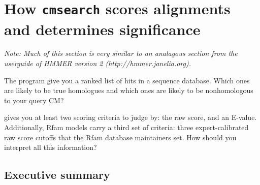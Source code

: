 \section{How \texttt{cmsearch} scores alignments and determines significance}

\emph{Note: Much of this section is very similar to an analagous
section from the userguide of HMMER version 2
(http://hmmer.janelia.org).}

The  program give you a ranked list of hits in a
sequence database.  Which ones are likely to be true homologues and
which ones are likely to be nonhomologous to your query CM?

 gives you at least two scoring criteria to judge
by: the  raw score, and an E-value. Additionally,
Rfam models carry a third set of criteria: three expert-calibrated raw
score cutoffs that the Rfam database maintainers set. How should you
interpret all this information?
\subsection{Executive summary}

